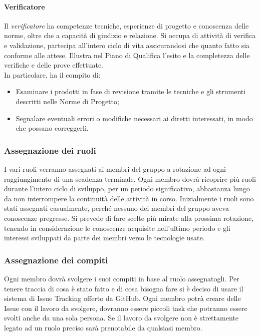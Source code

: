 \documentclass[../norme_di_progetto.tex]{subfiles}
\begin{document}
        \paragraph{Verificatore}
        Il \emph{verificatore} ha competenze tecniche, esperienze di progetto e conoscenza delle norme, oltre che a capacità di giudizio e relazione. Si occupa di attività di verifica e validazione, partecipa all'intero ciclo di vita assicurandosi che quanto fatto sia conforme alle attese. Illustra nel Piano di Qualifica l'esito e la completezza delle verifiche e delle prove effettuate.\\
        In particolare, ha il compito di:
        \begin{itemize}
            \item Esaminare i prodotti in fase di revisione tramite le tecniche e gli strumenti descritti nelle Norme di Progetto;
            \item Segnalare eventuali errori o modifiche necessari ai diretti interessati, in modo che possano correggerli.
        \end{itemize}

    \subsubsection{Assegnazione dei ruoli}
    I vari ruoli verranno assegnati ai membri del gruppo a rotazione ad ogni raggiungimento di una scadenza terminale. Ogni membro dovrà ricoprire più ruoli durante l'intero ciclo di sviluppo, per un periodo significativo, abbastanza lungo da non interrompere la continuità delle attività in corso.
    Inizialmente i ruoli sono stati assegnati casualmente, perché nessuno dei membri del gruppo aveva conoscenze pregresse. Si prevede di fare scelte più mirate alla prossima rotazione, tenendo in considerazione le conoscenze acquisite nell'ultimo periodo e gli interessi sviluppati da parte dei membri verso le tecnologie usate.
    \subsubsection{Assegnazione dei compiti}
    Ogni membro dovrà svolgere i suoi compiti in base al ruolo assegnatogli. Per tenere traccia di cosa è stato fatto e di cosa bisogna fare si è deciso di usare il sistema di Issue Tracking offerto da GitHub. Ogni membro potrà creare delle Issue con il lavoro da svolgere, dovranno essere piccoli task che potranno essere svolti anche da una sola persona. Se il lavoro da svolgere non è strettamente legato ad un ruolo preciso sarà prenotabile da qualsiasi membro.
\end{document}
